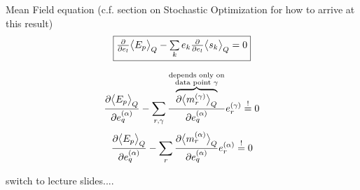 \begin{frame}[t] 
\begin{block}{Mean Field equation (c.f. section on Stochastic Optimization for how to arrive at this result)}
$$
	\fbox{$ \frac{\partial}{\partial e_l}\big<E_p\big>_Q 
		- \sum\limits_k e_k \frac{\partial}{\partial e_l} \big<s_k\big>_Q = 0
	$}
$$
\end{block}
$$	\frac{\partial \big< E_p \big>_Q}{\partial e_q^{(\alpha)}}
	- \sum\limits_{r, \gamma} \frac{
		\overbrace{ \partial \big< m_r^{(\gamma)} \big>_Q }^{
			\substack{	\text{depends only on} \\
					\text{data point } \gamma }}}{
			\partial e_q^{(\alpha)}}
		e_r^{(\gamma)} \stackrel{\mathrm{!}}{=} 0
$$
$$
	\frac{\partial \big< E_p \big>_Q}{\partial e_q^{(\alpha)}}
	- \sum\limits_r \frac{\partial \big< m_r^{(\alpha)} \big>_Q}{
		\partial e_q^{(\alpha)}}
		e_r^{(\alpha)} \stackrel{\mathrm{!}}{=} 0
$$

switch to lecture slides....
\end{frame}
